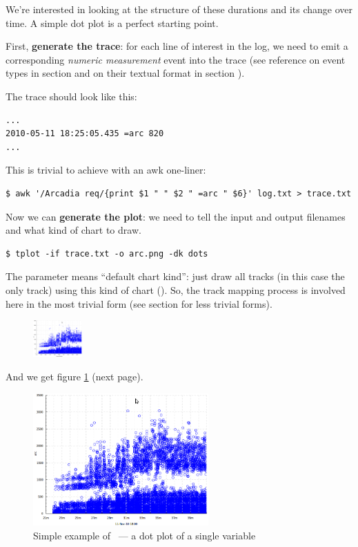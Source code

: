 \documentclass{article}
\begin{document}
We're interested in looking at the structure of these durations and its change over time. A simple dot plot is a perfect starting point.

First, \textbf{generate the trace}: for each line of interest in the log, we need to emit a corresponding \emph{numeric measurement} event into the trace (see reference on event types in section  and on their textual format in section ).

The trace should look like this:
\begin{verbatim}
...
2010-05-11 18:25:05.435 =arc 820
...
\end{verbatim}

This is trivial to achieve with an awk one-liner:
\begin{verbatim}
$ awk '/Arcadia req/{print $1 " " $2 " =arc " $6}' log.txt > trace.txt
\end{verbatim}

Now we can \textbf{generate the plot}: we need to tell \timeplot{} the input and output filenames and what kind of chart to draw.
\begin{verbatim}
$ tplot -if trace.txt -o arc.png -dk dots
\end{verbatim}

The parameter  means ``default chart kind'': just draw all tracks (in this case the only track) using this kind of chart (). So, the track mapping process is involved here in the most trivial form (see section  for less trivial forms).

\begin{figure}
\vspace{-25pt}
\center
\includegraphics[height=40pt]{pics/tplot/dots.png}
\end{figure}
And we get figure \ref{fig:tplot-simple-example} (next page).

\begin{figure}[h!]
\center
\includegraphics[width=0.6\textwidth]{pics/tplot/dots.png}
\caption{Simple example of \timeplot{}~--- a dot plot of a single variable}
\label{fig:tplot-simple-example}
\end{figure}
\end{document}
